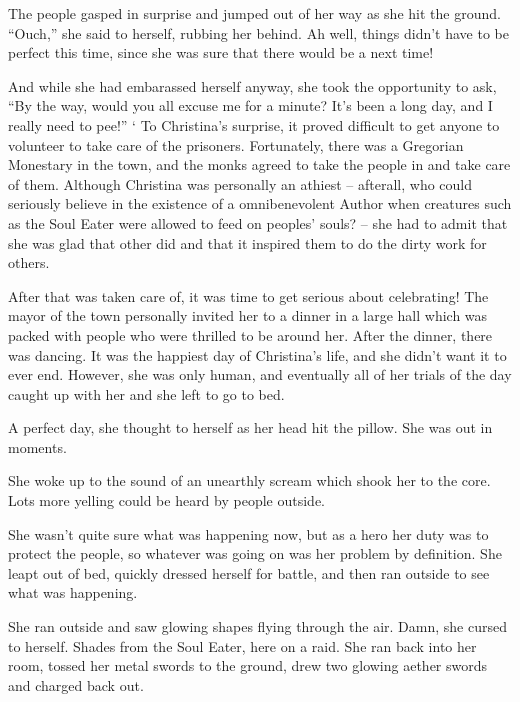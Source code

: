 \documentclass[showtrims,b6paper,draft,10pt]{memoir}
\begin{document}
The people gasped in surprise and jumped out of her way as she hit the ground.  ``Ouch,'' she said to herself, rubbing her behind.  Ah well, things didn't have to be perfect this time, since she was sure that there would be a next time!

And while she had embarassed herself anyway, she took the opportunity to ask, ``By the way, would you all excuse me for a minute?  It's been a long day, and I really need to pee!''
`
\timeskip
To Christina's surprise, it proved difficult to get anyone to volunteer to take care of the prisoners.  Fortunately, there was a Gregorian Monestary in the town, and the monks agreed to take the people in and take care of them.  Although Christina was personally an athiest -- afterall, who could seriously believe in the existence of a omnibenevolent Author when creatures such as the Soul Eater were allowed to feed on peoples' souls? -- she had to admit that she was glad that other did and that it inspired them to do the dirty work for others.

After that was taken care of, it was time to get serious about celebrating!  The mayor of the town personally invited her to a dinner in a large hall which was packed with people who were thrilled to be around her.  After the dinner, there was dancing.  It was the happiest day of Christina's life, and she didn't want it to ever end.  However, she was only human, and eventually all of her trials of the day caught up with her and she left to go to bed.

A perfect day, she thought to herself as her head hit the pillow.  She was out in moments.

\timeskip
She woke up to the sound of an unearthly scream which shook her to the core.  Lots more yelling could be heard by people outside.

She wasn't quite sure what was happening now, but as a hero her duty was to protect the people, so whatever was going on was her problem by definition.  She leapt out of bed, quickly dressed herself for battle, and then ran outside to see what was happening.

She ran outside and saw glowing shapes flying through the air.  Damn, she cursed to herself.  Shades from the Soul Eater, here on a raid.  She ran back into her room, tossed her metal swords to the ground, drew two glowing aether swords and charged back out.
\end{document}
